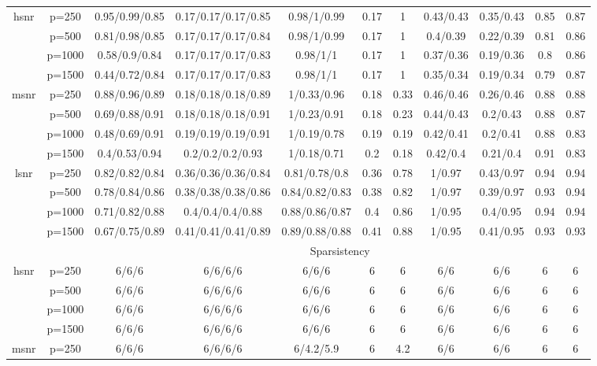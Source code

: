 \begin{table}[ht]
{\begin{tabular}{|c|c|ccccccccc|}
\midrule\multirow{4}[2]{*}{hsnr} & p=250 & 0.95/0.99/0.85 & 0.17/0.17/0.17/0.85 & 0.98/1/0.99 & 0.17 & 1 & 0.43/0.43 & 0.35/0.43 & 0.85 & 0.87 \\ 
   & p=500 & 0.81/0.98/0.85 & 0.17/0.17/0.17/0.84 & 0.98/1/0.99 & 0.17 & 1 & 0.4/0.39 & 0.22/0.39 & 0.81 & 0.86 \\ 
   & p=1000 & 0.58/0.9/0.84 & 0.17/0.17/0.17/0.83 & 0.98/1/1 & 0.17 & 1 & 0.37/0.36 & 0.19/0.36 & 0.8 & 0.86 \\ 
   & p=1500 & 0.44/0.72/0.84 & 0.17/0.17/0.17/0.83 & 0.98/1/1 & 0.17 & 1 & 0.35/0.34 & 0.19/0.34 & 0.79 & 0.87 \\ 
  \midrule\multirow{4}[2]{*}{msnr} & p=250 & 0.88/0.96/0.89 & 0.18/0.18/0.18/0.89 & 1/0.33/0.96 & 0.18 & 0.33 & 0.46/0.46 & 0.26/0.46 & 0.88 & 0.88 \\ 
   & p=500 & 0.69/0.88/0.91 & 0.18/0.18/0.18/0.91 & 1/0.23/0.91 & 0.18 & 0.23 & 0.44/0.43 & 0.2/0.43 & 0.88 & 0.87 \\ 
   & p=1000 & 0.48/0.69/0.91 & 0.19/0.19/0.19/0.91 & 1/0.19/0.78 & 0.19 & 0.19 & 0.42/0.41 & 0.2/0.41 & 0.88 & 0.83 \\ 
   & p=1500 & 0.4/0.53/0.94 & 0.2/0.2/0.2/0.93 & 1/0.18/0.71 & 0.2 & 0.18 & 0.42/0.4 & 0.21/0.4 & 0.91 & 0.83 \\ 
  \midrule\multirow{4}[2]{*}{lsnr} & p=250 & 0.82/0.82/0.84 & 0.36/0.36/0.36/0.84 & 0.81/0.78/0.8 & 0.36 & 0.78 & 1/0.97 & 0.43/0.97 & 0.94 & 0.94 \\ 
   & p=500 & 0.78/0.84/0.86 & 0.38/0.38/0.38/0.86 & 0.84/0.82/0.83 & 0.38 & 0.82 & 1/0.97 & 0.39/0.97 & 0.93 & 0.94 \\ 
   & p=1000 & 0.71/0.82/0.88 & 0.4/0.4/0.4/0.88 & 0.88/0.86/0.87 & 0.4 & 0.86 & 1/0.95 & 0.4/0.95 & 0.94 & 0.94 \\ 
   & p=1500 & 0.67/0.75/0.89 & 0.41/0.41/0.41/0.89 & 0.89/0.88/0.88 & 0.41 & 0.88 & 1/0.95 & 0.41/0.95 & 0.93 & 0.93 \\ 
   \midrule 
 \multicolumn{1}{|c}{} &       & \multicolumn{9}{c|}{Sparsistency} \\
\midrule\multirow{4}[2]{*}{hsnr} & p=250 & 6/6/6 & 6/6/6/6 & 6/6/6 & 6 & 6 & 6/6 & 6/6 & 6 & 6 \\ 
   & p=500 & 6/6/6 & 6/6/6/6 & 6/6/6 & 6 & 6 & 6/6 & 6/6 & 6 & 6 \\ 
   & p=1000 & 6/6/6 & 6/6/6/6 & 6/6/6 & 6 & 6 & 6/6 & 6/6 & 6 & 6 \\ 
   & p=1500 & 6/6/6 & 6/6/6/6 & 6/6/6 & 6 & 6 & 6/6 & 6/6 & 6 & 6 \\ 
  \midrule\multirow{4}[2]{*}{msnr} & p=250 & 6/6/6 & 6/6/6/6 & 6/4.2/5.9 & 6 & 4.2 & 6/6 & 6/6 & 6 & 6 \\ 

\end{tabular}}
\end{table}
